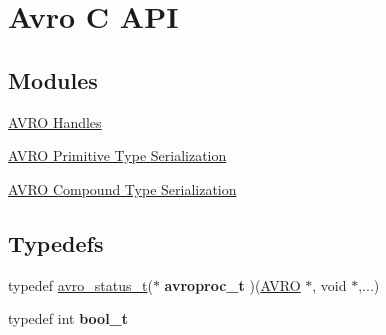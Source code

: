 \hypertarget{group___a_v_r_o}{
\section{Avro C API}
\label{group___a_v_r_o}
}
\subsection*{Modules}
\begin{CompactItemize}
\item 
\hyperlink{group___handle___routines}{AVRO Handles}
\item 
\hyperlink{group___primitives}{AVRO Primitive Type Serialization}
\item 
\hyperlink{group___compound}{AVRO Compound Type Serialization}
\end{CompactItemize}
\subsection*{Typedefs}
\begin{CompactItemize}
\item 
\hypertarget{group___a_v_r_o_ga7ab6d317ac114c2a8c6e963add2e078}{
typedef \hyperlink{group___handle___routines_g4271ca78aabaaad628d7b632aa5a1499}{avro\_\-status\_\-t}($\ast$ \textbf{avroproc\_\-t} )(\hyperlink{struct_a_v_r_o}{AVRO} $\ast$, void $\ast$,...)}
\label{group___a_v_r_o_ga7ab6d317ac114c2a8c6e963add2e078}

\item 
\hypertarget{group___a_v_r_o_g812d16e5494522586b3784e55d479912}{
typedef int \textbf{bool\_\-t}}
\label{group___a_v_r_o_g812d16e5494522586b3784e55d479912}

\end{CompactItemize}
